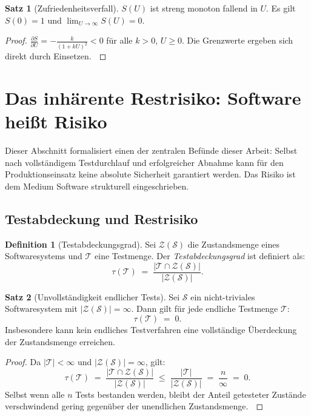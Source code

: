 ﻿\documentclass[a4paper,12pt]{article}
\theoremstyle{definition}
\newtheorem{definition}{Definition}
\newtheorem{satz}{Satz}
\newenvironment{beweis}{\begin{proof}}{\end{proof}}
\begin{document}
\begin{satz}[Zufriedenheitsverfall]
    $S(U)$ ist streng monoton fallend in $U$. Es gilt $S(0) = 1$ und
    $\lim_{U \to \infty} S(U) = 0$.
\end{satz}

\begin{beweis}
    $\frac{\partial S}{\partial U} = -\frac{k}{(1+kU)^2} < 0$ f\"ur alle $k > 0$, $U \geq 0$.
    Die Grenzwerte ergeben sich direkt durch Einsetzen. $\qedhere$
\end{beweis}

\section{Das inhärente Restrisiko: Software heißt Risiko}

Dieser Abschnitt formalisiert einen der zentralen Bef\"unde dieser Arbeit: Selbst nach
vollst\"andigem Testdurchlauf und erfolgreicher Abnahme kann f\"ur den Produktionseinsatz
keine absolute Sicherheit garantiert werden. Das Risiko ist dem Medium Software strukturell
eingeschrieben.

\subsection{Testabdeckung und Restrisiko}

\begin{definition}[Testabdeckungsgrad]
    Sei $\mathcal{Z}(\mathcal{S})$ die Zustandsmenge eines Softwaresystems und $\mathcal{T}$
    eine Testmenge. Der \emph{Testabdeckungsgrad} ist definiert als:
    \[
        \tau(\mathcal{T}) \;=\; \frac{|\mathcal{T} \cap \mathcal{Z}(\mathcal{S})|}{|\mathcal{Z}(\mathcal{S})|}.
    \]
\end{definition}

\begin{satz}[Unvollst\"andigkeit endlicher Tests]
\label{satz:tests}
    Sei $\mathcal{S}$ ein nicht-triviales Softwaresystem mit $|\mathcal{Z}(\mathcal{S})| = \infty$.
    Dann gilt f\"ur jede endliche Testmenge $\mathcal{T}$:
    \[
        \tau(\mathcal{T}) \;=\; 0.
    \]
    Insbesondere kann kein endliches Testverfahren eine vollst\"andige \"Uberdeckung
    der Zustandsmenge erreichen.
\end{satz}

\begin{beweis}
    Da $|\mathcal{T}| < \infty$ und $|\mathcal{Z}(\mathcal{S})| = \infty$, gilt:
    \[
        \tau(\mathcal{T}) \;=\;
        \frac{|\mathcal{T} \cap \mathcal{Z}(\mathcal{S})|}{|\mathcal{Z}(\mathcal{S})|}
        \;\leq\;
        \frac{|\mathcal{T}|}{|\mathcal{Z}(\mathcal{S})|}
        \;=\; \frac{n}{\infty} \;=\; 0.
    \]
    Selbst wenn alle $n$ Tests bestanden werden, bleibt der Anteil getesteter Zust\"ande
    verschwindend gering gegen\"uber der unendlichen Zustandsmenge. $\qedhere$
\end{beweis}
\end{document}
